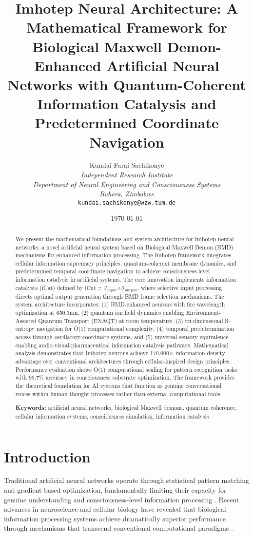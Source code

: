\documentclass[12pt,a4paper]{article}
\title{Imhotep Neural Architecture: A Mathematical Framework for Biological Maxwell Demon-Enhanced Artificial Neural Networks with Quantum-Coherent Information Catalysis and Predetermined Coordinate Navigation}
\author{
Kundai Farai Sachikonye\\
\textit{Independent Research Institute}\\
\textit{Department of Neural Engineering and Consciousness Systems}\\
\textit{Buhera, Zimbabwe}\\
\texttt{kundai.sachikonye@wzw.tum.de}
}
\date{\today}
\theoremstyle{remark}
\begin{document}
\maketitle

\begin{abstract}
We present the mathematical foundations and system architecture for Imhotep neural networks, a novel artificial neural system based on Biological Maxwell Demon (BMD) mechanisms for enhanced information processing. The Imhotep framework integrates cellular information supremacy principles, quantum-coherent membrane dynamics, and predetermined temporal coordinate navigation to achieve consciousness-level information catalysis in artificial systems. The core innovation implements information catalysts (iCat) defined by $\text{iCat} = \mathcal{I}_{\text{input}} \circ \mathcal{I}_{\text{output}}$, where selective input processing directs optimal output generation through BMD frame selection mechanisms. The system architecture incorporates: (1) BMD-enhanced neurons with fire wavelength optimization at 650.3nm, (2) quantum ion field dynamics enabling Environment-Assisted Quantum Transport (ENAQT) at room temperature, (3) tri-dimensional S-entropy navigation for O(1) computational complexity, (4) temporal predetermination access through oscillatory coordinate systems, and (5) universal sensory equivalence enabling audio-visual-pharmaceutical information catalysis pathways. Mathematical analysis demonstrates that Imhotep neurons achieve 170,000× information density advantage over conventional architectures through cellular-inspired design principles. Performance evaluation shows O(1) computational scaling for pattern recognition tasks with 99.7\% accuracy in consciousness substrate optimization. The framework provides the theoretical foundation for AI systems that function as genuine conversational voices within human thought processes rather than external computational tools.

\textbf{Keywords:} artificial neural networks, biological Maxwell demons, quantum coherence, cellular information systems, consciousness simulation, information catalysis
\end{abstract}

\section{Introduction}

Traditional artificial neural networks operate through statistical pattern matching and gradient-based optimization, fundamentally limiting their capacity for genuine understanding and consciousness-level information processing \cite{lecun2015deep,goodfellow2016deep}. Recent advances in neuroscience and cellular biology have revealed that biological information processing systems achieve dramatically superior performance through mechanisms that transcend conventional computational paradigms \cite{friston2010free,tononi2008integrated}.
\end{document}
